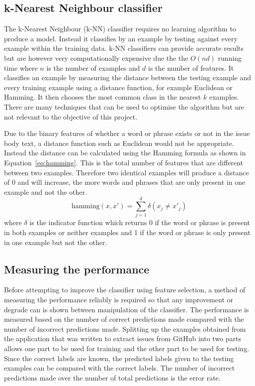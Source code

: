 \subsection{k-Nearest Neighbour classifier}
The k-Nearest Neighbour (k-NN) classifier requires no learning algorithm to produce a model. Instead it classifies by an example
by testing against every example within the training data. k-NN classifiers can provide accurate results but are however very
computationally expensive due the the $O(nd)$ running time where $n$ is the number of examples and $d$ is the number of
features. It classifies an example by measuring the distance between the testing example and every training example using a
distance function, for example Euclidean or Hamming. It then chooses the most common class in the nearest $k$ examples. There
are many techniques that can be used to optimise the algorithm but are not relevant to the objective of this project.

Due to the binary features of whether a word or phrase exists or not in the issue body text, a distance function such as
Euclidean would not be appropriate. Instead the distance can be calculated using the Hamming formula as shown in
Equation~\ref{eq:hamming}. This is the total number of features that are different between two examples. Therefore two identical
examples will produce a distance of 0 and will increase, the more words and phrases that are only present in one example and not
the other.
\begin{equation}
	\label{eq:hamming}
	\mathrm{hamming}(x,x') = \sum^d_{j=1} \delta (x_{j} \neq x'_{j})
\end{equation}
where $\delta$ is the indicator function which returns 0 if the word or phrase is present in both examples or neither examples
and 1 if the word or phrase is only present in one example but not the other.

\subsection{Measuring the performance}
Before attempting to improve the classifier using feature selection, a method of measuring the performance reliably is required
so that any improvement or degrade can is shown between manipulation of the classifier. The performance is measured based on the
number of correct predictions made compared with the number of incorrect predictions made. Splitting up the examples obtained
from the application that was written to extract issues from GitHub into two parts allows one part to be used for training and
the other part to be used for testing. Since the correct labels are known, the predicted labels given to the testing examples
can be compared with the correct labels. The number of incorrect predictions made over the number of total predictions is the
error rate.

